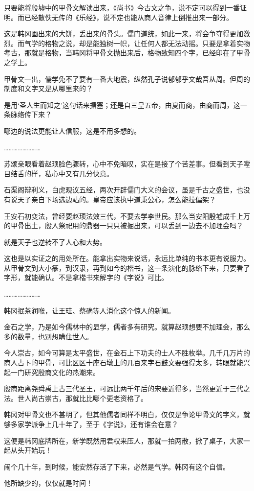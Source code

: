 只要能将殷墟中的甲骨文解读出来，《尚书》今古文之争，说不定可以得到一番证明。而已经散佚无传的《乐经》，说不定也能从商人音律上倒推出来一部分。

这是韩冈画出来的大饼，丢出来的骨头。儒门道统，如此一来，将会争夺得更加激烈。而气学的格物之说，却是能独树一帜，让任何人都无法动摇。只要是拿着实物考古，那就是格物，当韩冈将甲骨文抛出来后，格物致知四个字，已经印在了甲骨之学上。

甲骨文一出，儒学免不了要有一番大地震，纵然孔子说郁郁乎文哉吾从周。但周的制度和文字又是从哪里来的？

是用‘圣人生而知之’这句话来搪塞；还是自三皇五帝，由夏而商，由商而周，这一条脉络传下来？

哪边的说法更能让人信服，这是不用多想的。

……………………

苏颂亲眼看着赵顼脸色骤转，心中不免暗叹，实在是接了个苦差事。但看到天子瞠目结舌的样，私心中又有几分快意。

石渠阁辩利义，白虎观议五经，两次开辟儒门大义的会议，虽是千古之盛世，也没有说天子亲自下场选边站的。皇帝应该执中道秉公心，怎么能拉偏架？

王安石初变法，曾经要赵顼法效三代，不要去学李世民。那么当安阳殷墟成千上万的甲骨出土，殷人祭祀用的鼎器一只只被掘出来，可以丢到一边去不加理会吗？

就是天子也逆转不了人心和大势。

这也是以实证之的用处所在。能拿出实物来说话，永远比单纯的书本更有说服力。从甲骨文到大小篆，到汉隶，再到如今的楷书，这一条演化的脉络下来，只要看了字形，就能确认。不是拿楷书来解字的《字说》可比。

……………………

韩冈抿茶润喉，让王珪、蔡确等人消化这个惊人的新闻。

金石之学，乃是如今儒林中的显学，儒者多有研究。就算赵顼想要不加理会，那么多的数量，也别想瞒住世人。

今人崇古，如今可算是太平盛世，在金石上下功夫的士人不胜枚举。几千几万片的商人占卜的甲骨，可比区区十座石墩上的几百来字石鼓文要强得太多，转眼就能兴起一门研究殷商文化的热潮来。

殷商距离尧舜禹上古三代圣王，可远比两千年后的宋要近得多，当然更近于三代之法。世人尚古崇古，那就比比哪个更老资格了。

韩冈对甲骨文也不甚明了，但其他儒者同样不明白，仅仅是争论甲骨文的字义，就够多家学派争上几十年了，至于《字说》，还有谁会在意？

这便是韩冈底牌所在，新学既然用君权来压人，那就一拍两散，掀了桌子，大家一起从头开始玩！

闹个几十年，到时候，能安然存活了下来，必然是气学。韩冈有这个自信。

他所缺少的，仅仅就是时间！
